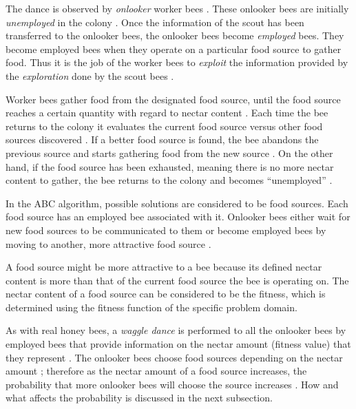 The dance is observed by \emph{onlooker} worker bees \cite{ABCCompareStudy,ABCImageEnhancement}. These onlooker bees are initially \emph{unemployed} in the colony \cite{ABCCompareStudy,ABCImageEnhancement}. Once the information of the scout has been transferred to the onlooker bees, the onlooker bees become \emph{employed} bees\cite{ABCCompareStudy,ABCImageEnhancement}. They become employed bees when they operate on a particular food source to gather food\cite{ABCCompareStudy,ABCImageEnhancement}. Thus it is the job of the worker bees to \emph{exploit} the information provided by the \emph{exploration} done by the scout bees \cite{ABCCompareStudy,ABCNumericalOptimization}. 

Worker bees gather food from the designated food source, until the food source reaches a certain quantity with regard to nectar content \cite{ABCCompareStudy,ABCNumericalOptimization}. Each time the bee returns to the colony it evaluates the current food source versus other food sources discovered \cite{ABCCompareStudy,ABCNumericalOptimization}. If a better food source is found, the bee abandons the previous source and starts gathering food from the new source \cite{ABCCompareStudy,ABCNumericalOptimization}. On the other hand, if the food source has been exhausted, meaning there is no more nectar content to gather, the bee returns to the colony and becomes ``unemployed'' \cite{ABCCompareStudy,ABCNumericalOptimization}.

In the \gls{ABC} algorithm, possible solutions are considered to be food sources\cite{ABCCompareStudy,ABCNumericalOptimization}. Each food source has an employed bee associated with it. Onlooker bees either wait for new food sources to be communicated to them or become employed bees by moving to another, more attractive food source \cite{ABCCompareStudy,ABCNumericalOptimization}. 

A food source might be more attractive to a bee because its defined nectar content is more than that of the current food source the bee is operating on\cite{ABCCompareStudy,ABCNumericalOptimization}. The nectar content of a food source can be considered to be the fitness, which is determined using the fitness function of the specific problem domain\cite{ABCCompareStudy,ABCNumericalOptimization}.

As with real honey bees, a \emph{waggle dance} is performed to all the onlooker bees by employed bees that provide information on the nectar amount (fitness value) that they represent \cite{ABCReconfigDistro,ABCCompareStudy,ABCImageEnhancement}. The onlooker bees choose food sources depending on the nectar amount \cite{ABCReconfigDistro,ABCCompareStudy,ABCImageEnhancement}; therefore as the nectar amount of a food source increases, the probability that more onlooker bees will choose the source increases \cite{ABCReconfigDistro,ABCCompareStudy,ABCImageEnhancement}. How and what affects the probability is discussed in the next subsection.

